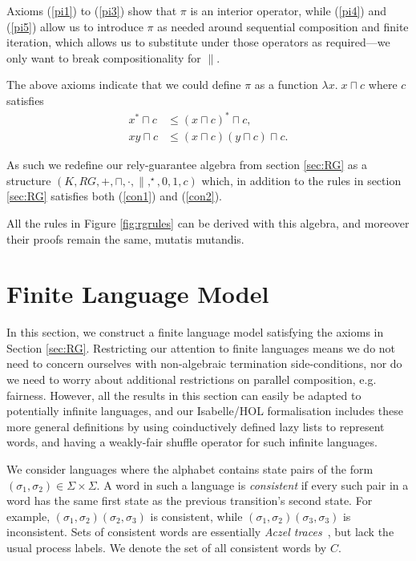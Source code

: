 \documentclass{llncs}
\begin{document}
Axioms (\ref{pi1}) to (\ref{pi3}) show that $\pi$ is an interior
operator, while (\ref{pi4}) and (\ref{pi5}) allow us to introduce
$\pi$ as needed around sequential composition and finite iteration,
which allows us to substitute under those operators as required---we
only want to break compositionality for $\|$.

The above axioms indicate that we could define $\pi$ as a function
$\lambda x.\; x \sqcap c$ where $c$ satisfies
\begin{align}
x^* \sqcap c &\le (x \sqcap c)^* \sqcap c, \label{con1}\\
xy \sqcap c &\le (x \sqcap c)(y \sqcap c) \sqcap c. \label{con2}
\end{align}

As such we redefine our rely-guarantee algebra from section
\ref{sec:RG} as a structure $(K,RG,+,\sqcap,\cdot,\|,^\star,0,1,c)$
which, in addition to the rules in section \ref{sec:RG} satisfies both
(\ref{con1}) and (\ref{con2}).

All the rules in Figure \ref{fig:rgrules} can be derived with this
algebra, and moreover their proofs remain the same, mutatis
mutandis.

\section{Finite Language Model}
\label{sec:Model}

In this section, we construct a finite language model satisfying the
axioms in Section \ref{sec:RG}. Restricting our attention to finite
languages means we do not need to concern ourselves with non-algebraic
termination side-conditions, nor do we need to worry about additional
restrictions on parallel composition, e.g. fairness. However, all the
results in this section can easily be adapted to potentially
infinite languages, and our Isabelle/HOL formalisation includes these more
general definitions by using coinductively defined lazy lists to
represent words, and having a weakly-fair shuffle operator for such
infinite languages.

We consider languages where the alphabet contains state pairs of the
form $(\sigma_1,\sigma_2) \in \Sigma \times \Sigma$. A word in such a
language is \emph{consistent} if every such pair in a word has the
same first state as the previous transition's second state. For
example, $(\sigma_1,\sigma_2)(\sigma_2,\sigma_3)$ is consistent, while
$(\sigma_1,\sigma_2)(\sigma_3,\sigma_3)$ is inconsistent. Sets of
consistent words are essentially \emph{Aczel
  traces}~\cite{boer_formal_1999}, but lack the usual process
labels. We denote the set of all consistent words by $C$.
\end{document}
